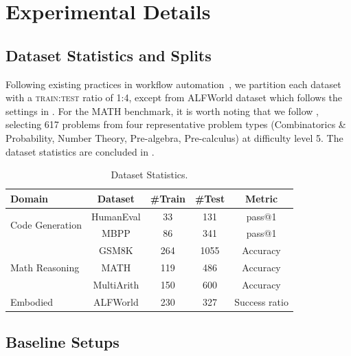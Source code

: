 \documentclass{article}
\theoremstyle{plain}
\theoremstyle{definition}
\theoremstyle{remark}
\begin{document}
\section{Experimental Details}
\subsection{Dataset Statistics and Splits}\label{app:dataset}

Following existing practices in workflow automation~\cite{saad2024archon,hu2024adas,zhang2024aflow}, we partition each dataset with a \textsc{train:test} ratio of 1:4, except from ALFWorld dataset which follows the settings in \cite{shang2024agentsquare}. For the MATH benchmark, it is worth noting that we follow \cite{hong2024datainterpreter}, selecting 617 problems from four representative problem types (Combinatorics \& Probability, Number Theory, Pre-algebra, Pre-calculus) at difficulty level 5. The dataset statistics are concluded in .

\begin{table}[!h]
\vspace{-1em}
\caption{Dataset Statistics.}\label{tab:dataset}

\vspace{0.1em}
\centering
\begin{tabular}{l|cccc}
\toprule
Domain & Dataset & \#Train & \#Test & Metric  \\ 
\midrule
\multirow{2}{*}{Code Generation} & HumanEval & 33 & 131 & pass@1\\ 
& MBPP & 86 & 341 & pass@1\\ 
\midrule
\multirow{3}{*}{Math Reasoning}& GSM8K & 264 & 1055 & Accuracy\\ 
& MATH & 119 & 486 & Accuracy\\ 
& MultiArith &150 & 600 & Accuracy\\
\midrule
Embodied & ALFWorld & 230 & 327 & Success ratio\\
\bottomrule
\end{tabular}
\end{table}

\subsection{Baseline Setups}\label{app:baselines}
\end{document}

